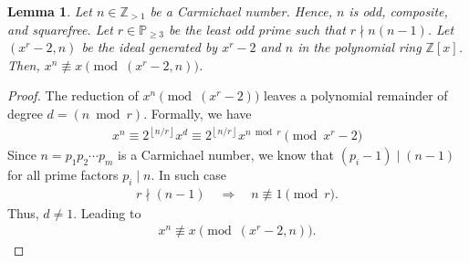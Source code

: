 \documentclass{article}
\theoremstyle{plain}
\newtheorem{lemma}[theorem]{Lemma}
\theoremstyle{definition}
\newcommand{\floor}[1]{\left\lfloor #1 \right\rfloor}
\newcommand{\Z}{\mathbb{Z}}
\begin{document}
\begin{lemma} \label{proof:carmichalenumberxnnotequalsx}
Let $n \in \Z_{>1}$ be a Carmichael number. Hence, $n$ is odd, composite, and squarefree. Let $r \in \mathbb{P}_{\geq 3}$ be the least odd prime such that $r \nmid n (n-1)$. Let $(x^r-2, n)$ be the ideal generated by $x^r-2$ and $n$ in the polynomial ring $\Z[x]$. Then, $x^n \not\equiv x \pmod{(x^r-2,n)}$.
\end{lemma}
\begin{proof}
The reduction of $x^n \pmod{(x^r-2)}$ leaves a polynomial remainder of degree $d = (n \bmod r)$. Formally, we have
\begin{align*}
    x^n \equiv 2^{\floor{n/r}} x^d \equiv 2^{\floor{n/r}} x^{n \bmod r} \pmod{x^r-2}
\end{align*}
Since $n = p_1 p_2 \cdots p_m$ is a Carmichael number, we know that $(p_i-1) \mid (n-1)$ for all prime factors $p_i \mid n$. In such case
\begin{align*}
    r \nmid (n-1) \quad \Longrightarrow \quad n \not\equiv 1 \pmod{r} . 
\end{align*}
Thus, $d \not= 1$. Leading to
\begin{align*}
    x^n \not\equiv x \pmod{(x^r-2, n)} .
\end{align*}
\end{proof}
\end{document}
